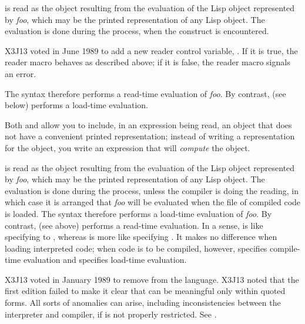 \begin{flushdesc}
\item[\cd{\#.}]
 is read as the object resulting from the evaluation
of the Lisp object represented by {\it foo},
which may be the printed representation of any Lisp object.
The evaluation is done during the  process, when the 
construct is encountered.

\begin{newer}
X3J13 voted in June 1989  to add a new reader control variable,
.  If it is true,
the  reader macro behaves as described above;
if it is false, the  reader macro signals an error.
\end{newer}

The  syntax therefore performs a read-time evaluation of {\it foo}.
By contrast, \cd{\#,} (see below) performs a load-time evaluation.

Both  and \cd{\#,} allow you to include, in an expression
being read, an object that does not have a convenient printed
representation; instead of writing a representation for the object,
you write an expression that will {\it compute} the object.
\end{flushdesc}

\begin{obsolete}
\begin{flushdesc}
\item[\cd{\#,}]
 is read as the object resulting from the evaluation
of the Lisp object represented by {\it foo},
which may be the printed representation of any Lisp object.
The evaluation is done during the  process,
unless the compiler is doing the reading, in which case it is arranged
that {\it foo} will be evaluated when the file of compiled code is loaded.
The \cd{\#,} syntax therefore performs a load-time evaluation of {\it foo}.
By contrast,  (see above) performs a read-time evaluation.
In a sense, \cd{\#,} is like specifying  to
, whereas  is more like specifying .
It makes no difference when loading interpreted code; when code
is to be compiled, however,  specifies compile-time evaluation and
\cd{\#,} specifies load-time evaluation.
\end{flushdesc}
\end{obsolete}

\begin{new}
X3J13 voted in January 1989
to remove \cd{\#,} from the language.
X3J13 noted that the first edition failed to make it clear that \cd{\#,}
can be meaningful only within quoted forms.  All sorts of anomalies can arise,
including inconsistencies between the interpreter and compiler, if \cd{\#,}
is not properly restricted.  See .
\end{new}

